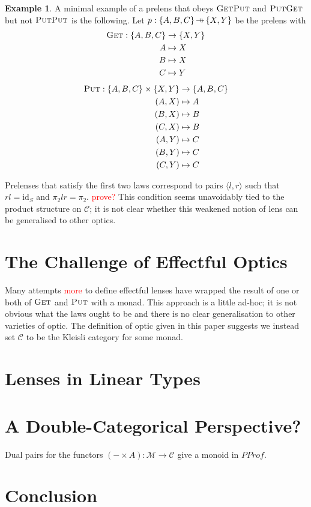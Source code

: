 \documentclass[11pt,a4paper]{article}
\theoremstyle{plain}
\theoremstyle{definition}
\newtheorem{example}[theorem]{Example}
\newcommand{\C}{\mathscr{C}}
\newcommand{\M}{\mathscr{M}}
\newcommand{\id}{\mathrm{id}}
\newcommand{\fget}{\textsc{Get}}
\newcommand{\fput}{\textsc{Put}}
\newcommand{\hto}{\ensuremath{\,\mathaccent\shortmid\rightarrow\,}}
\newcommand{\todo}[1]{\textcolor{red}{\small #1}}
\begin{document}
\begin{example}
A minimal example of a prelens that obeys $\fget\fput$ and $\fput\fget$ but not $\fput\fput$ is the following. Let $p : \{A,B,C\} \hto \{X, Y\}$ be the prelens with
\begin{align*}
\fget : \{A,B,C\} &\to \{X, Y\} \\
A &\mapsto X \\
B &\mapsto X \\
C &\mapsto Y 
\end{align*}
\begin{align*}
\fput : \{A,B,C\} \times \{X, Y\} &\to \{A,B,C\} \\
(A,X) &\mapsto A \\
(B,X) &\mapsto B \\
(C,X) &\mapsto B \\
(A,Y) &\mapsto C \\
(B,Y) &\mapsto C \\
(C,Y) &\mapsto C
\end{align*}
\end{example}

Prelenses that satisfy the first two laws correspond to pairs $\langle l, r \rangle$ such that $rl = \id_S$ and $\pi_2lr = \pi_2$. \todo{prove?} This condition seems unavoidably tied to the product structure on $\C$; it is not clear whether this weakened notion of lens can be generalised to other optics.

\section{The Challenge of Effectful Optics}

Many attempts \cite{ReflectionsOnMonadicLenses} \todo{more} to define effectful lenses have wrapped the result of one or both of $\fget$ and $\fput$ with a monad. This approach is a little ad-hoc; it is not obvious what the laws ought to be and there is no clear generalisation to other varieties of optic. The definition of optic given in this paper suggests we instead set $\C$ to be the Kleisli category for some monad.

\section{Lenses in Linear Types}

\section{A Double-Categorical Perspective?}

Dual pairs for the functors $(- \times A) : \M \to \C$ give a monoid in $PProf$.


\section{Conclusion}



\end{document}
